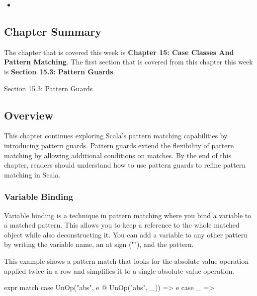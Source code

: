 \begin{itemize}
    \item {}
\end{itemize}

\newpage

\subsection{Chapter Summary}

The chapter that is covered this week is \textbf{Chapter 15: Case Classes And Pattern Matching}. The first section that is covered from this chapter this week is \textbf{Section 15.3: Pattern Guards}.

\begin{notes}{Section 15.3: Pattern Guards}
    \subsection*{Overview}

    This chapter continues exploring Scala's pattern matching capabilities by introducing pattern guards. Pattern guards extend the flexibility of pattern matching by allowing additional conditions 
    on matches. By the end of this chapter, readers should understand how to use pattern guards to refine pattern matching in Scala.
    
    \subsubsection*{Variable Binding}
    
    Variable binding is a technique in pattern matching where you bind a variable to a matched pattern. This allows you to keep a reference to the whole matched object while also deconstructing it. 
    You can add a variable to any other pattern by writing the variable name, an at sign ("\@"), and the pattern.
    
    \begin{highlight}
    
        This example shows a pattern match that looks for the absolute value operation applied twice in a row and simplifies it to a single absolute value operation.
    
    \begin{code}[Scala]
    expr match {
        case UnOp("abs", e @ UnOp("abs", _)) => e
        case _ =>
    }
    \end{code}
    

\end{highlight}
\end{notes}
